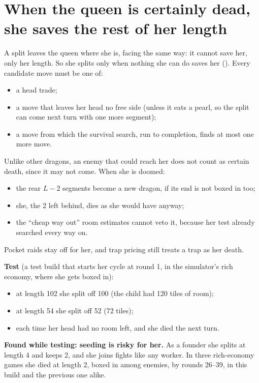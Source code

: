 \documentclass[11pt,a4paper]{article}
\newcommand{\code}[1]{\texttt{\detokenize{#1}}}
\begin{document}
\section{When the queen is certainly dead, she saves the rest of her length}\label{sec:doomed}
A split leaves the queen where she is, facing the same way: it cannot save her, only her length. So she splits only when
nothing she can do saves her (\code{play_split_escape}). Every candidate move must be one of:
\begin{itemize}
  \item a head trade;
  \item a move that leaves her head no free side (unless it eats a pearl, so the split can come next turn with one more segment);
  \item a move from which the survival search, run to completion, finds at most one more move.
\end{itemize}
Unlike other dragons, an enemy that could reach her does not count as certain death, since it may not come. When she is doomed:
\begin{itemize}
  \item the rear $L-2$ segments become a new dragon, if its end is not boxed in too;
  \item she, the 2 left behind, dies as she would have anyway;
  \item the ``cheap way out'' room estimates cannot veto it, because her test already searched every way on.
\end{itemize}
Pocket raids stay off for her, and trap pricing still treats a trap as her death.

\textbf{Test} (a test build that starts her cycle at round 1, in the simulator's rich economy, where she gets boxed in):
\begin{itemize}
  \item at length 102 she split off 100 (the child had 120 tiles of room);
  \item at length 54 she split off 52 (72 tiles);
  \item each time her head had no room left, and she died the next turn.
\end{itemize}

\textbf{Found while testing: seeding is risky for her.} As a founder she splits at length 4 and keeps 2, and she joins fights like
any worker. In three rich-economy games she died at length 2, boxed in among enemies, by rounds 26--39, in this build and the
previous one alike.

\end{document}
